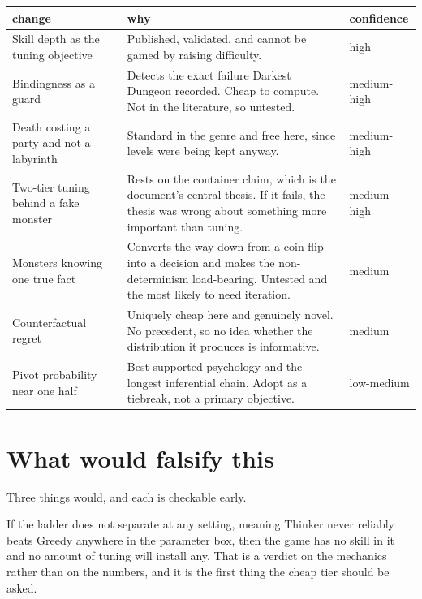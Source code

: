 \documentclass[11pt,a4paper]{article}
\begin{document}
\begin{center}
\begin{tabular}{@{}>{\raggedright\arraybackslash}p{}@{\hspace{3mm}}>{\raggedright\arraybackslash}p{}@{\hspace{3mm}}>{\raggedright\arraybackslash}p{}@{}}
\toprule
\textbf{change} & \textbf{why} & \textbf{confidence} \\
\midrule
Skill depth as the tuning objective &
Published, validated, and cannot be gamed by raising difficulty. &
high \\[2mm]
Bindingness as a guard &
Detects the exact failure Darkest Dungeon recorded. Cheap to compute. Not in the literature, so
untested. &
medium-high \\[2mm]
Death costing a party and not a labyrinth &
Standard in the genre and free here, since levels were being kept anyway. &
medium-high \\[2mm]
Two-tier tuning behind a fake monster &
Rests on the container claim, which is the document's central thesis. If it fails, the thesis
was wrong about something more important than tuning. &
medium-high \\[2mm]
Monsters knowing one true fact &
Converts the way down from a coin flip into a decision and makes the non-determinism
load-bearing. Untested and the most likely to need iteration. &
medium \\[2mm]
Counterfactual regret &
Uniquely cheap here and genuinely novel. No precedent, so no idea whether the distribution it
produces is informative. &
medium \\[2mm]
Pivot probability near one half &
Best-supported psychology and the longest inferential chain. Adopt as a tiebreak, not a primary
objective. &
low-medium \\
\bottomrule
\end{tabular}
\end{center}
\normalsize

\section{What would falsify this}

Three things would, and each is checkable early.

If the ladder does not separate at any setting, meaning Thinker never reliably beats Greedy
anywhere in the parameter box, then the game has no skill in it and no amount of tuning will
install any. That is a verdict on the mechanics rather than on the numbers, and it is the first
thing the cheap tier should be asked.
\end{document}
